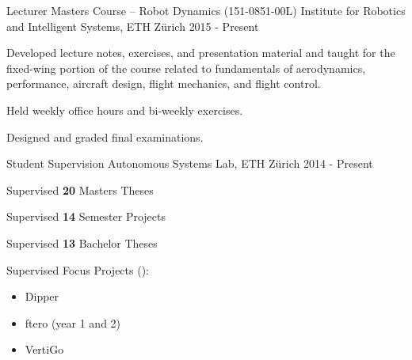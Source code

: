 \label{sec:teaching}
\begin{cventries}


\cvprojwideentry
  	{Lecturer} %
  	{Masters Course -- Robot Dynamics (151-0851-00L)} %
    {Institute for Robotics and Intelligent Systems, ETH Z\"{u}rich} %
    {2015 - Present} %
    {
      \begin{cvitems} %
        \item Developed lecture notes, exercises, and presentation material and taught for the fixed-wing portion of the course related to fundamentals of aerodynamics, performance, aircraft design, flight mechanics, and flight control.
		\item Held weekly office hours and bi-weekly exercises.
		\item Designed and graded final examinations.
      \end{cvitems}
    } %
    {} %
    {\showprojectdescriptions}

\cvprojwideentry
  	{Student Supervision} %
  	{} %
    {Autonomous Systems Lab, ETH Z\"{u}rich} %
    {2014 - Present} %
    {
      \begin{cvitems} %
        \item Supervised \textbf{20} Masters Theses
		\item Supervised \textbf{14} Semester Projects
		\item Supervised \textbf{13} Bachelor Theses
		\item Supervised Focus Projects ():
		\begin{itemize}[label=-]
			\item Dipper 
			\item ftero (year 1 and 2) 
			\item VertiGo 	
		\end{itemize}
      \end{cvitems}
    } %
    {} %
    {\showprojectdescriptions}


\end{cventries}
